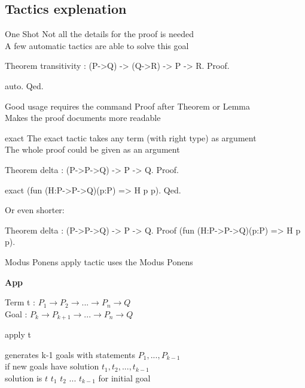 \subsection{Tactics explenation}
\begin{frame}[fragile]{One Shot}
	Not all the details for the proof is needed\\
	\medskip
	\pause
	A few automatic tactics are able to solve this goal
	\pause
	\begin{user}
	Theorem transitivity : (P->Q) -> (Q->R) -> P -> R.
	Proof.
	\end{user}
	\pause
	\begin{user}
		auto.
	Qed.
	\end{user}
	\pause
	Good usage requires the command Proof after Theorem or Lemma\\
	\smallskip
	Makes the proof documents more readable
\end{frame}
\begin{frame}[fragile]{exact}
	The exact tactic takes any term (with right type) as argument\\
	\pause
	\smallskip
	The whole proof could be given as an argument\\
	\pause
	\medskip
	\begin{user}
	Theorem delta : (P->P->Q) -> P -> Q.
	Proof.
	\end{user}
	\pause
	\begin{user}
	exact (fun (H:P->P->Q)(p:P) => H p p).
	Qed.
	\end{user}
	\pause
	\medskip
	Or even shorter:
	\begin{user}
	Theorem delta : (P->P->Q) -> P -> Q.
	Proof (fun (H:P->P->Q)(p:P) => H p p).
	\end{user}
\end{frame}
\begin{frame}[fragile]{Modus Ponens}
	apply tactic uses the Modus Ponens\\
	\pause
	\medskip
	\begin{prooftree}
	\textbf{App}
	\end{prooftree}
	\pause
	Term t : $P_1 \rightarrow P_2 \rightarrow ... \rightarrow P_n \rightarrow Q$ \\
	Goal : $P_k \rightarrow P_{k+1} \rightarrow ... \rightarrow P_n \rightarrow Q$
	\pause
	\medskip
	\begin{user}
	apply t
	\end{user}
	generates k-1 goals with statements $P_1, ..., P_{k-1}$\\
	\pause
	\smallskip
	if new goals have solution $t_1, t_2, ..., t_{k-1}$\\
	solution is $t$ $t_1$ $t_2$ ... $t_{k-1}$ for initial goal
\end{frame}
